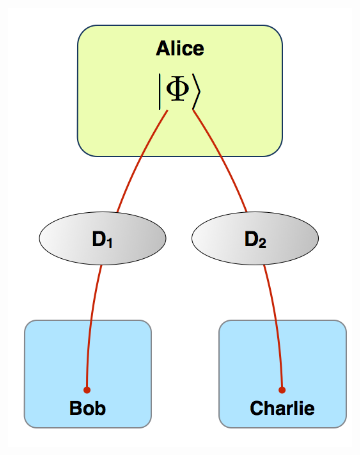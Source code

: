 \documentclass[%
 reprint,
 amsmath,amssymb,
 aps,
]{revtex4-1}
\begin{document}
\begin{figure}
        \centering
        \begin{subfigure}[b]{0.23\textwidth}
                \includegraphics[width=\textwidth]{expd}
                \caption{}
                \label{fig:d}
        \end{subfigure}
        \begin{subfigure}[b]{0.23\textwidth}

\end{subfigure}
\end{figure}
\end{document}

